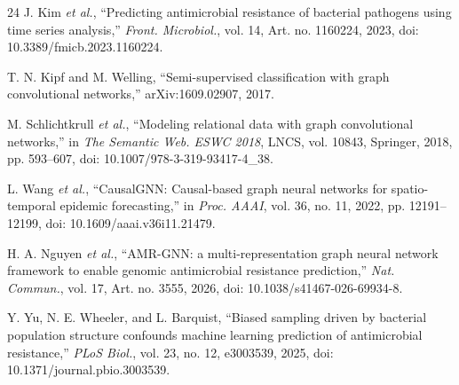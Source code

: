 \documentclass[journal]{IEEEtran}
\begin{document}
{\begin{thebibliography}{24}
J. Kim \textit{et al.}, ``Predicting antimicrobial resistance of bacterial pathogens using time series analysis,'' \textit{Front. Microbiol.}, vol. 14, Art. no. 1160224, 2023, doi: 10.3389/fmicb.2023.1160224.

T. N. Kipf and M. Welling, ``Semi-supervised classification with graph convolutional networks,'' arXiv:1609.02907, 2017.

M. Schlichtkrull \textit{et al.}, ``Modeling relational data with graph convolutional networks,'' in \textit{The Semantic Web. ESWC 2018}, LNCS, vol. 10843, Springer, 2018, pp. 593--607, doi: 10.1007/978-3-319-93417-4\_38.

L. Wang \textit{et al.}, ``CausalGNN: Causal-based graph neural networks for spatio-temporal epidemic forecasting,'' in \textit{Proc. AAAI}, vol. 36, no. 11, 2022, pp. 12191--12199, doi: 10.1609/aaai.v36i11.21479.

H. A. Nguyen \textit{et al.}, ``AMR-GNN: a multi-representation graph neural network framework to enable genomic antimicrobial resistance prediction,'' \textit{Nat. Commun.}, vol. 17, Art. no. 3555, 2026, doi: 10.1038/s41467-026-69934-8.

Y. Yu, N. E. Wheeler, and L. Barquist, ``Biased sampling driven by bacterial population structure confounds machine learning prediction of antimicrobial resistance,'' \textit{PLoS Biol.}, vol. 23, no. 12, e3003539, 2025, doi: 10.1371/journal.pbio.3003539.

\end{thebibliography}
}
\end{document}
